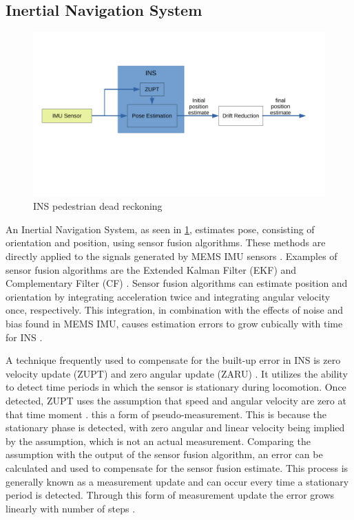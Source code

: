 \subsection{Inertial Navigation System}
\label{sec:INS}
\begin{figure}[H]
	\centering
	\includegraphics[trim=20 140 290 80, clip, width=0.8\linewidth]{images/INS_diagram}
	\caption{\ac{INS} pedestrian dead reckoning}
	\label{fig:ins_diagram}
\end{figure}
An Inertial Navigation System, as seen in \cref{fig:ins_diagram}, estimates pose, consisting of orientation and position, using sensor fusion algorithms. These methods are directly applied to the signals generated by MEMS IMU sensors \cite{Wu2019}. Examples of sensor fusion algorithms are the Extended Kalman Filter (EKF) and Complementary Filter (CF) \cite{Kok2017}. Sensor fusion algorithms can estimate position and orientation by integrating acceleration twice and integrating angular velocity once, respectively. This integration, in combination with the effects of noise and bias found in MEMS IMU, causes estimation errors to grow cubically with time for INS \cite{Harle2013}. \par

A technique frequently used to compensate for the built-up error in INS is zero velocity update (ZUPT) and zero angular update (ZARU) \cite{Harle2013}. It utilizes the ability to detect time periods in which the sensor is stationary during locomotion. Once detected, ZUPT uses the assumption that speed and angular velocity are zero at that time moment \cite{Wu2019,Harle2013}. this a form of pseudo-measurement. This is because the stationary phase is detected, with zero angular and linear velocity being implied by the assumption, which is not an actual measurement. Comparing the assumption with the output of the sensor fusion algorithm, an error can be calculated and used to compensate for the sensor fusion estimate. This process is generally known as a measurement update and can occur every time a stationary period is detected.  Through this form of measurement update the error grows linearly with number of steps \cite{foxlin2005pedestrian}.\par


